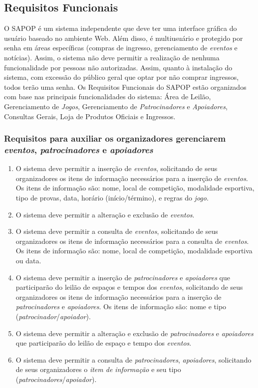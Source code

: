 \documentclass[
10pt, %
a4paper, %
oneside, %
headinclude,footinclude, %
BCOR5mm, %
]{scrartcl}
\begin{document}
\subsection{Requisitos Funcionais}
O SAPOP é um sistema independente que deve ter uma interface gráfica do usuário baseado
no ambiente Web. Além disso, é multiusuário e protegido por senha em áreas específicas
(compras de ingresso, gerenciamento de \textit{eventos} e notícias). Assim, o sistema não deve
permitir a realização de nenhuma funcionalidade por pessoas não autorizadas. Assim,
quanto à instalação do sistema, com excessão do público geral que optar por não
comprar ingressos, todos terão uma senha. Os Requisitos Funcionais do SAPOP estão
organizados com base nas principais funcionalidades do sistema: Área de Leilão,
Gerenciamento de \textit{Jogos}, Gerenciamento de \textit{Patrocinadores} e \textit{Apoiadores}, Consultas
Gerais, Loja de Produtos Oficiais e Ingressos.

\subsubsection{Requisitos para auxiliar os organizadores gerenciarem \textit{eventos}, \textit{patrocinadores} e \textit{apoiadores}}
\begin{enumerate}[noitemsep]
	\item O sistema deve permitir a inserção de \textit{eventos}, solicitando de seus organizadores os itens de informação necessários para a inserção de \textit{eventos}. Os itens de informação são: nome, local de competição, modalidade esportiva, tipo de provas, data, horário (início/término), e regras do \textit{jogo}.
	\item O sistema deve permitir a alteração e exclusão de \textit{eventos}.
	\item O sistema deve permitir a consulta de \textit{eventos}, solicitando de seus organizadores os itens de informação necessários para a consulta de \textit{eventos}. Os itens de informação são: nome, local de competição, modalidade esportiva ou data.
	\item O sistema deve permitir a inserção de \textit{patrocinadores} e \textit{apoiadores} que participarão do leilão de espaços e tempos dos \textit{eventos}, solicitando de seus organizadores os itens de informação necessários para a inserção de \textit{patrocinadores} e \textit{apoiadores}. Os itens de informação são: nome e tipo (\textit{patrocinador}/\textit{apoiador}).
	\item O sistema deve permitir a alteração e exclusão de \textit{patrocinadores} e \textit{apoiadores} que participarão do leilão de espaço e tempo dos \textit{eventos}.
	\item O sistema deve permitir a consulta de \textit{patrocinadores}, \textit{apoiadores}, solicitando de seus organizadores o \textit{item de informação} e seu tipo (\textit{patrocinadores}/\textit{apoiador}).
\end{enumerate}
\end{document}
